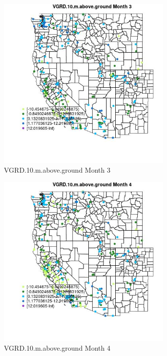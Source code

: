 \begin{figure} 
\centering  
\includegraphics[width=0.77\textwidth]{Code_Outputs/Report_ML_input_PM25_Step4_part_e_de_duplicated_aveswNAs_MapObsMo3VGRD10maboveground.jpg} 
\caption{\label{fig:Report_ML_input_PM25_Step4_part_e_de_duplicated_aveswNAsMapObsMo3VGRD10maboveground}VGRD.10.m.above.ground Month 3} 
\end{figure} 
 

\begin{figure} 
\centering  
\includegraphics[width=0.77\textwidth]{Code_Outputs/Report_ML_input_PM25_Step4_part_e_de_duplicated_aveswNAs_MapObsMo4VGRD10maboveground.jpg} 
\caption{\label{fig:Report_ML_input_PM25_Step4_part_e_de_duplicated_aveswNAsMapObsMo4VGRD10maboveground}VGRD.10.m.above.ground Month 4} 
\end{figure} 
 

